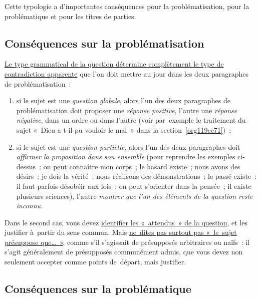 \documentclass[a4paper,12pt]{report}
\begin{document}
Cette typologie a d'importantes conséquences pour la problématisation,
pour la problématique et pour les titres de parties.


\subsection{Conséquences sur la problématisation}
\label{sec:org900ded2}

\uline{Le type grammatical de la question détermine complètement le type de
contradiction apparente} que l'on doit mettre au jour dans les deux
paragraphes de problématisation : 

\begin{enumerate}
\item si le sujet est une \emph{question globale}, alors l'un des deux
paragraphes de problématisation doit proposer une \emph{réponse positive},
l'autre une \emph{réponse négative}, dans un ordre ou dans l'autre (voir
par exemple le traitement du sujet « Dieu a-t-il pu vouloir le mal »
dans la section \ref{org119ee71}) ;

\item si le sujet est une \emph{question partielle}, alors l'un des deux
paragraphes doit \emph{affirmer la proposition dans son ensemble} (pour
reprendre les exemples ci-dessus : on peut connaître mon corps ; le
hasard existe ; nous avons des désirs ; je dois la vérité ; nous
réalisons des démonstrations ; le passé existe ; il faut parfois
désobéir aux lois ; on peut s'orienter dans la pensée ; il existe
plusieurs sciences), l'autre \emph{montrer que l'un des éléments de la
question reste inconnu}.
\end{enumerate}

Dans le second cas, vous devez \uline{identifier les « attendus » de la
question}, et les justifier à partir du sens commun. Mais \uline{ne dites pas
surtout pas « le sujet présuppose que\ldots{} »}, comme s'il s'agissait de
présupposés arbitraires ou naïfs : il s'agit généralement de présupposés
communément admis, que vous devez non seulement accepter comme points
de départ, mais justifier.


\subsection{Conséquences sur la problématique}
\label{sec:org38b070a}
\end{document}
